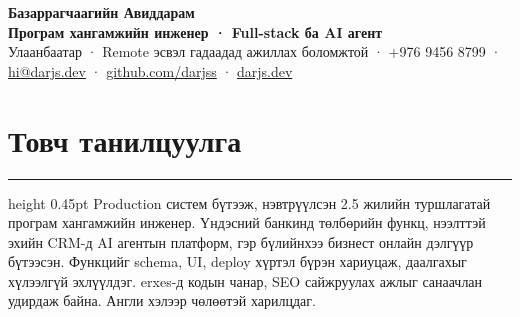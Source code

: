 \documentclass[9.5pt,letterpaper]{article}
\newcommand{\cvsection}[1]{\section*{#1}\vspace{3pt}\hrule height 0.45pt\vspace{3pt}}
\begin{document}
{\centering
  {\fontsize{16}{17}\selectfont\textbf{Базаррагчаагийн Авиддарам}}\\[0pt]
  \textbf{Програм хангамжийн инженер · Full-stack ба AI агент}\\[1pt]
  Улаанбаатар · Remote эсвэл гадаадад ажиллах боломжтой · +976 9456 8799 · \href{mailto:hi@darjs.dev}{hi@darjs.dev} · \href{https://github.com/darjss}{github.com/darjss} · \href{https://darjs.dev}{darjs.dev}
\par}

\cvsection{Товч танилцуулга}
Production систем бүтээж, нэвтрүүлсэн 2.5 жилийн туршлагатай програм хангамжийн инженер. Үндэсний банкинд төлбөрийн функц, нээлттэй эхийн CRM-д AI агентын платформ, гэр бүлийнхээ бизнест онлайн дэлгүүр бүтээсэн. Функцийг schema, UI, deploy хүртэл бүрэн хариуцаж, даалгахыг хүлээлгүй эхлүүлдэг. erxes-д кодын чанар, SEO сайжруулах ажлыг санаачлан удирдаж байна. Англи хэлээр чөлөөтэй харилцдаг.
\end{document}
